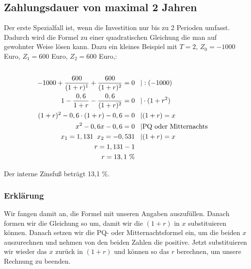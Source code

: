 \subsection{Zahlungsdauer von maximal 2 Jahren}
Der erste Spezialfall ist, wenn die Investition nur bis zu 2 Perioden umfasst. Dadurch wird die Formel zu einer quadratischen Gleichung die man auf gewohnter Weise lösen kann. Dazu ein kleines Beispiel mit $T = 2$, $Z_0 = -1000$ Euro, $Z_1 = 600$ Euro, $Z_2 = 600$ Euro,:
\begin{align*}                                                                               \\
    -1000 + \frac{600}{(1+r)^1} + \frac{600}{(1+r)^2} = 0 & \text{\phantom m}|:(-1000)                    \\
    1 - \frac{0,6}{1+r} - \frac{0,6}{(1+r)^2} = 0         & \text{\phantom m}|\cdot(1+r^2)                \\
    (1+r)^2 - 0,6\cdot(1+r) - 0,6 = 0                     & \text{\phantom m}|(1+r) = x                   \\
    x^2-0,6x-0,6=0                                        & \text{\phantom m}|\text{PQ oder Mitternachts} \\
    x_1 = 1,131 \text{\phantom p} x_2 = -0,531            & \text{\phantom m}|(1+r) = x                   \\
    r = 1,131 - 1                                                                                         \\
    r = 13,1 \text{ \%}
\end{align*}
\begin{center}
    Der interne Zinsfuß beträgt 13,1 \%.
\end{center}
\newpage
\subsubsection{Erklärung}
Wir fangen damit an, die Formel mit unseren Angaben auszufüllen. Danach formen wir die Gleichung so um, damit wir die $(1+r)$ in $x$ substituieren können. Danach setzen wir die PQ-
oder Mitternachtsformel ein, um die beiden $x$ auszurechnen und nehmen von den beiden Zahlen die positive. Jetzt substituieren wir wieder das $x$ zurück in $(1+r)$ und können so das $r$ berechnen, um unsere Rechnung zu beenden.

